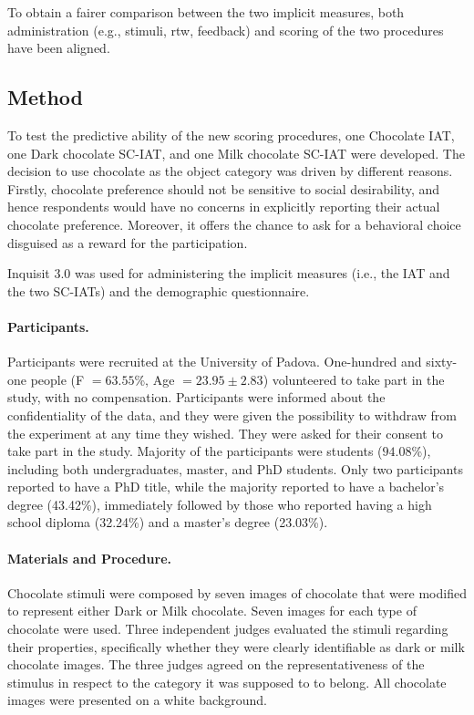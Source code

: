 \documentclass[12pt]{book}
\begin{document}
To obtain a fairer comparison between the two implicit measures, both administration (e.g., stimuli, rtw, feedback) and scoring of the two procedures have been aligned.

\subsection{Method}\label{sub:fairerMethod}

To test the predictive ability of the new scoring procedures, one Chocolate IAT, one Dark chocolate SC-IAT, and one Milk chocolate SC-IAT were developed. 
The decision to use chocolate as the object category was driven by different reasons. Firstly, chocolate preference should not be sensitive to social desirability, and hence respondents would have no concerns in explicitly reporting their actual chocolate preference. Moreover, it offers the chance to ask for a behavioral choice disguised as a reward for the participation.

Inquisit 3.0 \cite{inquisit3} was used for administering the implicit measures (i.e., the IAT and the two SC-IATs) and the demographic questionnaire.


\paragraph{Participants.}

Participants were recruited at the University of Padova. One-hundred and sixty-one people (F $= 63.55$\%, Age $= 23.95 \pm 2.83$) volunteered to take part in the study, with no compensation. Participants were informed about the confidentiality of the data, and they were given the possibility to withdraw from the experiment at any time they wished. They were asked for their consent to take part in the study. Majority of the participants were students ($94.08$\%), including both undergraduates, master, and PhD students. Only two participants reported to have a PhD title, while the majority reported to have a bachelor’s degree (43.42\%), immediately followed by those who reported having a high school diploma (32.24\%) and a master’s degree (23.03\%). 

\paragraph{Materials and Procedure.}

Chocolate stimuli were composed by seven images of chocolate that were modified to represent either Dark or Milk chocolate. Seven images for each type of chocolate were used. Three independent judges evaluated the stimuli regarding their properties, specifically whether they were clearly identifiable as dark or milk chocolate images. The three judges agreed on the representativeness of the stimulus in respect to the category it was supposed to to belong. All chocolate images were presented on a white background. 
\end{document}
